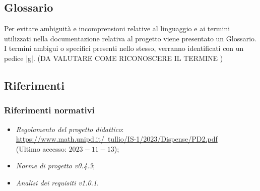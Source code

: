 \documentclass[10pt, a4paper]{article}
\begin{document}

\subsection{Glossario}
Per evitare ambiguità e incomprensioni relative al linguaggio e ai termini utilizzati nella documentazione relativa al progetto viene presentato un Glossario. I termini ambigui o specifici presenti nello stesso, verranno identificati con un pedice |g|. (DA VALUTARE COME RICONOSCERE IL TERMINE )
\subsection{Riferimenti}

\subsubsection{Riferimenti normativi} 
\begin{itemize}
\item \textit{Regolamento del progetto didattico}: \\
\href{https://www.math.unipd.it/~tullio/IS-1/2023/Dispense/PD2.pdf}{https://www.math.unipd.it/~tullio/IS-1/2023/Dispense/PD2.pdf}\\
(Ultimo accesso: $2023-11-13$);
\item \textit{Norme di progetto v0.4.3};
\item \textit{Analisi dei requisiti v1.0.1}.
\end{itemize}

\end{document}
